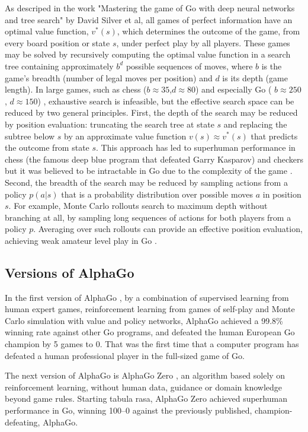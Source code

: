 \documentclass{article}
\begin{document}
As descriped in the work "Mastering the game of Go with deep neural networks and tree search"\cite{Silver_2016} by David Silver et al, all games of perfect information have an optimal value function, $v^*(s)$, which determines the outcome of the game, from every board position
or state $s$, under perfect play by all players. These games may be solved by recursively computing the optimal value function in a search tree
containing approximately $b^d$ possible sequences of moves, where $b$ is
the game’s breadth (number of legal moves per position) and $d$ is its depth (game length). In large games, such as chess ($b \approx 35$,$ d \approx 80$) \cite{Allis1994SearchingFS} and especially Go ( $b \approx 250$, $d \approx 150$) \cite{Allis1994SearchingFS}, exhaustive search is infeasible, but the effective search space can be reduced by two general principles. First, the depth of the search may be reduced by position evaluation: truncating the search tree at state $s$ and replacing the subtree below $s$ by an approximate value function $v(s) \approx v^*(s)$ that predicts the outcome from state $s$. This approach has led to superhuman performance in chess \cite{CAMPBELL200257} (the famous deep blue program that defeated Garry Kasparov) and checkers \cite{10.1007/3-540-48957-6_8} but it was believed to be intractable in Go due to the complexity of the game \cite{MULLER2002145}. Second, the breadth of the search
may be reduced by sampling actions from a policy $p(a|s)$ that is a probability distribution over possible moves $a$ in position $s$. For example,
Monte Carlo rollouts search to maximum depth without branching at all, by sampling long sequences of actions for both players from a
policy $p$. Averaging over such rollouts can provide an effective position evaluation, achieving weak amateur level play in Go \cite{Bouzy2004}.

\subsection{Versions  of AlphaGo}
In the first version of AlphaGo \cite{Silver_2016}, by a combination of supervised learning from human expert games, reinforcement learning from games of self-play and Monte Carlo simulation with value and policy networks, AlphaGo achieved a 99.8\% winning rate against other Go programs, and defeated the human European Go champion by 5 games to 0. That was the first time that a computer program has defeated a human professional player in the full-sized game of Go.

The next version of AlphaGo is AlphaGo Zero \cite{silver2017mastering}, an algorithm based solely on reinforcement learning, without human data, guidance or domain knowledge beyond game rules. Starting tabula rasa, AlphaGo Zero achieved superhuman performance in Go, winning 100–0 against the previously published, champion-defeating, AlphaGo.
\end{document}
